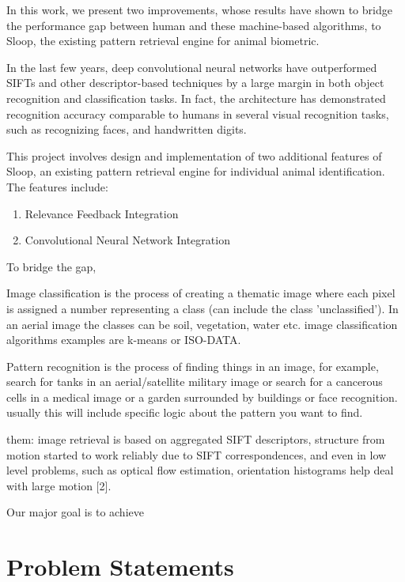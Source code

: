 In this work, we present two improvements, whose results have shown to bridge the performance gap between human and these machine-based algorithms, to Sloop, the existing pattern retrieval engine for animal biometric.

In the last few years, deep convolutional neural networks\cite{lecun95, kriz12} have outperformed SIFTs and other descriptor-based techniques by a large margin in both object recognition and classification tasks\cite{kriz12, fisher14, ILSVRC15}. In fact, the architecture has demonstrated recognition accuracy comparable to humans in several visual recognition tasks, such as recognizing faces\cite{deepface14}, and handwritten digits\cite{mnist13}. 



This project involves design and implementation of two additional features of Sloop, an existing pattern retrieval engine for individual animal identification. The features include:
\begin{enumerate}
	\item Relevance Feedback Integration
	\item Convolutional Neural Network Integration
\end{enumerate}


To bridge the gap, 



Image classification is the process of creating a thematic image where each pixel is assigned a number representing a class (can include the class 'unclassified'). In an aerial image the classes can be soil, vegetation, water etc. image classification algorithms examples are k-means or ISO-DATA.

Pattern recognition is the process of finding things in an image, for example, search for tanks in an aerial/satellite military image or search for a cancerous cells in a medical image or a garden surrounded by buildings or face recognition. usually this will include specific logic about the pattern you want to find.

them: image retrieval is based on aggregated SIFT descriptors, structure from motion started to work reliably due to SIFT correspondences, and even in low level problems, such as optical flow estimation, orientation histograms help deal with large motion [2].

Our major goal is to achieve 

\section{Problem Statements}


